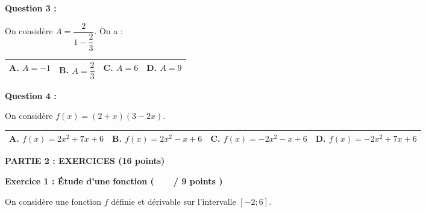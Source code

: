\documentclass[12pt,a4paper]{exam}
\begin{document}
\vspace{10pt}

\textbf{Question 3 :}
\vspace{5pt}

On considère $A = \dfrac{2}{1 - \dfrac{2}{3}}$. On a :

\begin{center}
    \renewcommand{\arraystretch}{3}
    \begin{tabular}{|m{3.4cm}|m{3.4cm}|m{3.9cm}|m{3.4cm}|}
    \hline
    \centering \vspace{-0.3cm} \textbf{A.} $A = -1$ & 
    \centering \vspace{-0.3cm} \textbf{B.} $A = \dfrac{2}{3}$ & 
    \centering \vspace{-0.3cm} \textbf{C.} $A = 6$ & 
    \centering \vspace{-0.3cm} \textbf{D.} $A = 9$ \tabularnewline
    \hline
    \end{tabular}
\end{center}

\vspace{10pt}

\textbf{Question 4 :}
\vspace{5pt}

On considère $f(x) = (2 + x)(3 - 2x)$.

\begin{center}
    \renewcommand{\arraystretch}{3}
    \begin{tabular}{|m{3.4cm}|m{3.4cm}|m{3.9cm}|m{3.8cm}|}
    \hline
    \centering \vspace{-0.3cm} \textbf{A.} $f(x) = 2x^2 +7x + 6$& 
    \centering \vspace{-0.3cm} \textbf{B.} $f(x) = 2x^2 -x + 6$& 
    \centering \vspace{-0.3cm} \textbf{C.} $f(x) = -2x^2 -x + 6$& 
    \centering \vspace{-0.3cm} \textbf{D.} $f(x) = -2x^2 +7x + 6$ \tabularnewline
    \hline
    \end{tabular}
\end{center}

\vspace{10pt}


\noindent
\textbf{\large{PARTIE 2 : EXERCICES (16 points)}}

\vspace{10pt}
\noindent
\textbf{Exercice 1 : Étude d’une fonction (\ \ \ \  / 9 points )}

\vspace{5pt}
On considère une fonction $f$ définie et dérivable sur l’intervalle $\left[-2;6\right]$.
\end{document}

